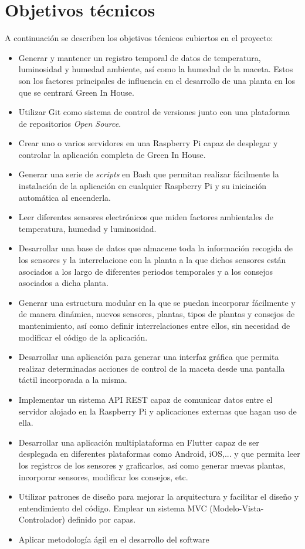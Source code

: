 \section{Objetivos técnicos}
A continuación se describen los objetivos técnicos cubiertos en el proyecto:
\begin{itemize}
    \item Generar y mantener un registro temporal de datos de temperatura, luminosidad y humedad ambiente, así como la humedad de la maceta. Estos son los factores principales de influencia en el desarrollo de una planta en los que se centrará Green In House.
    \item Utilizar Git como sistema de control de versiones junto con
    una plataforma de repositorios \textit{Open Source}.
    \item Crear uno o varios servidores en una Raspberry Pi capaz de desplegar y controlar la aplicación completa de Green In House.
    \item Generar una serie de \textit{scripts} en Bash que permitan realizar fácilmente la instalación de la aplicación en cualquier Raspberry Pi y su iniciación automática al encenderla.
    \item Leer diferentes sensores electrónicos que miden factores ambientales de temperatura, humedad y luminosidad.
    \item Desarrollar una base de datos que almacene toda la información recogida de los sensores y la interrelacione con la planta a la que dichos sensores están asociados a los largo de diferentes periodos temporales y a los consejos asociados a dicha planta.
    \item Generar una estructura modular en la que se puedan incorporar fácilmente y de manera dinámica, nuevos sensores, plantas, tipos de plantas y consejos de mantenimiento, así como definir interrelaciones entre ellos, sin necesidad de modificar el código de la aplicación.
    \item Desarrollar una aplicación para generar una interfaz gráfica que permita realizar determinadas acciones de control de la maceta desde una pantalla táctil incorporada a la misma. 
    \item Implementar un sistema API REST capaz de comunicar datos entre el servidor alojado en la Raspberry Pi y aplicaciones externas que hagan uso de ella.  
    \item Desarrollar una aplicación multiplataforma en Flutter capaz de ser desplegada en diferentes plataformas como Android, iOS,... y que permita leer los registros de los sensores y graficarlos, así como generar nuevas plantas, incorporar sensores, modificar los consejos, etc.   
    \item Utilizar patrones de diseño para mejorar la arquitectura y facilitar el diseño y entendimiento del código. Emplear un sistema MVC (Modelo-Vista-Controlador) definido por capas.   
    \item Aplicar metodología ágil en el desarrollo del software 
\end{itemize}


